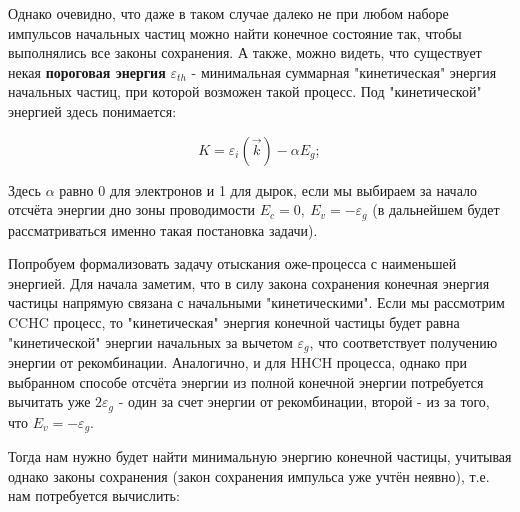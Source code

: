 \documentclass[../main.tex]{subfiles}
\begin{document}
    Однако очевидно, что даже в таком случае далеко не при любом наборе импульсов
    начальных частиц можно найти конечное состояние так, чтобы выполнялись все 
    законы сохранения. А также, можно видеть, что существует некая 
    \textbf{пороговая энергия} $\varepsilon_{th}$ - минимальная суммарная 
    "кинетическая" энергия начальных частиц, при которой возможен такой процесс.
    Под "кинетической" энергией здесь понимается:

    \begin{equation*}
        K = \varepsilon_i(\vec{k}) - \alpha E_g;
    \end{equation*}

    Здесь $\alpha$ равно 0 для электронов и 1 для дырок, если мы выбираем за 
    начало отсчёта энергии дно зоны проводимости $E_c = 0,~E_v = - \varepsilon_g$
    (в дальнейшем будет рассматриваться именно такая постановка задачи).


    Попробуем формализовать задачу отыскания оже-процесса с наименьшей энергией. 
    Для начала заметим, что в силу закона
    сохранения конечная энергия частицы напрямую связана с начальными "кинетическими".
    Если мы рассмотрим CCHC процесс, то "кинетическая" энергия конечной частицы
    будет равна "кинетической" энергии начальных за вычетом $\varepsilon_g$, что соответствует
    получению энергии от рекомбинации. Аналогично, и для HHCH процесса, однако
    при выбранном способе отсчёта энергии из полной конечной энергии потребуется 
    вычитать уже $2\varepsilon_g$ - один за счет энергии от рекомбинации, второй - из за того, 
    что $E_v = - \varepsilon_g$.

    Тогда нам нужно будет найти минимальную энергию конечной частицы, учитывая
    однако законы сохранения (закон сохранения импульса уже учтён неявно), 
    т.е. нам потребуется вычислить: 
\end{document}
